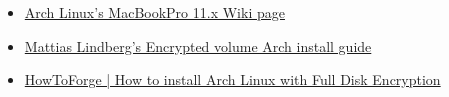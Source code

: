 \begin{itemize}
	\item \href{https://wiki.archlinux.org/index.php/MacBookPro11,x#Using_the_MacBook.27s_native_EFI_bootloader_.28recommended.29}{Arch Linux's MacBookPro 11.x Wiki page}
	\item \href{https://gist.github.com/mattiaslundberg/8620837}{Mattias Lindberg's Encrypted volume Arch install guide}
	\item \href{https://www.howtoforge.com/tutorial/how-to-install-arch-linux-with-full-disk-encryption/}{HowToForge | How to install Arch Linux with Full Disk Encryption}
\end{itemize}


